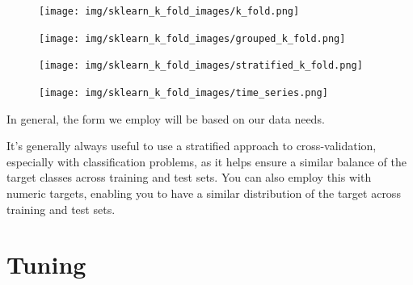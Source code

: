 \documentclass[
  letterpaper,
]{krantz}
\begin{document}
\begin{figure}

\begin{minipage}{0.50\linewidth}

\texttt{[image: img/sklearn\_k\_fold\_images/k\_fold.png]}

\end{minipage}%
%
\begin{minipage}{0.50\linewidth}

\texttt{[image: img/sklearn\_k\_fold\_images/grouped\_k\_fold.png]}

\end{minipage}%
\newline
\begin{minipage}{0.50\linewidth}

\texttt{[image: img/sklearn\_k\_fold\_images/stratified\_k\_fold.png]}

\end{minipage}%
%
\begin{minipage}{0.50\linewidth}

\texttt{[image: img/sklearn\_k\_fold\_images/time\_series.png]}

\end{minipage}%

\end{figure}%

In general, the form we employ will be based on our data needs.

\begin{tcolorbox}[enhanced jigsaw, colframe=quarto-callout-tip-color-frame, opacityback=0, breakable, left=2mm, rightrule=.15mm, toprule=.15mm, arc=.35mm, leftrule=.75mm, colback=white, bottomrule=.15mm]

It's generally always useful to use a stratified approach to
cross-validation, especially with classification problems, as it helps
ensure a similar balance of the target classes across training and test
sets. You can also employ this with numeric targets, enabling you to
have a similar distribution of the target across training and test sets.

\end{tcolorbox}

\section{Tuning}\label{sec-ml-tuning}
\end{document}
